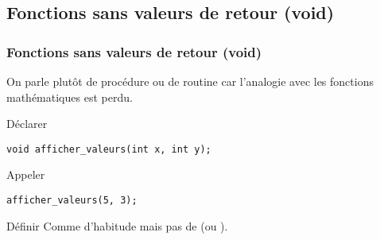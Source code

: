 \documentclass[xcolor=pdftex,svgnames,table]{beamer}
\begin{document}



\subsection[Procédures]{Fonctions sans valeurs de retour (void)}
\begin{frame}[fragile]
  \frametitle{Fonctions sans valeurs de retour (void)}

On parle plutôt de procédure ou de routine car l'analogie avec les
fonctions mathématiques est perdu.

 \begin{block}{Déclarer}
    \begin{lstlisting}[basicstyle=\ttfamily\small] 
void afficher_valeurs(int x, int y);
     \end{lstlisting}
  \end{block}

  \begin{block}{Appeler}
  \begin{lstlisting}[basicstyle=\ttfamily\small] 
afficher_valeurs(5, 3);
   \end{lstlisting}  
  \end{block}

  \begin{block}{Définir}
Comme d'habitude mais pas de  (ou ).
\end{block}
\end{frame}
\end{document}
